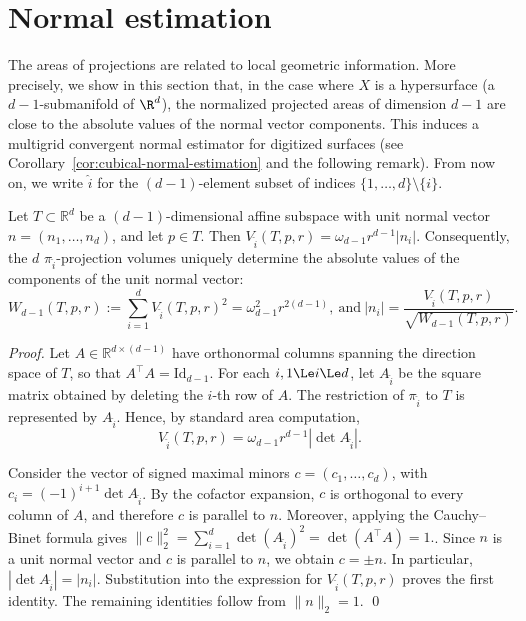 \section{Normal estimation}
\label{sec-normals}

The areas of projections are related to local geometric
information. More precisely, we show in this section that, in the case
where $X$ is a hypersurface (a $d-1$-submanifold of $\R^d$), the
normalized projected areas of dimension $d-1$ are close to the
absolute values of the normal vector components. This induces a
multigrid convergent normal estimator for digitized surfaces (see
Corollary~\ref{cor:cubical-normal-estimation} and the following
remark). From now on, we write $\widehat{i}$ for the $(d-1)$-element subset of
indices $\{1,\ldots,d\} \setminus \{ i \}$.

\begin{theorem}
\label{thm:normal-recovery}
Let $T\subset\mathbb R^d$ be a $(d-1)$-dimensional affine subspace
with unit normal vector $n=(n_1,\ldots,n_d)$, and let $p \in T$.
Then \( V_{\widehat{i}}(T,p,r)=\omega_{d-1}r^{d-1}|n_i|. \)
Consequently, the $d$ $\pi_{\widehat{i}}$-projection volumes uniquely
determine the absolute values of the components
of the unit normal vector:
\[
W_{d-1}(T,p,r) := \sum_{i=1}^d V_{\widehat{i}}(T,p,r)^2
=
\omega_{d-1}^2r^{2(d-1)},
~\text{and}~
|n_i|=\frac{V_{\widehat{i}}(T,p,r)}
{\sqrt{W_{d-1}(T,p,r)}}.
\]
\end{theorem}

\begin{proof}
Let $A\in\mathbb R^{d\times(d-1)}$ have orthonormal columns spanning
the direction space of $T$, so that $A^\top A=\mathrm{Id}_{d-1}$.  For each $i, 1\Le i \Le
d$, let $A_{\widehat i}$ be the square matrix obtained by deleting the
$i$-th row of $A$.  The restriction of $\pi_{\widehat i}$ to $T$ is
represented by $A_{\widehat i}$.  Hence, by standard area computation, 
\[
V_{\widehat{i}}(T,p,r)=\omega_{d-1}r^{d-1}|\det A_{\widehat i}|.
\]

\begin{sloppypar}
Consider the vector of signed maximal minors $c=(c_1,\ldots,c_d)$,
with $c_i = (-1)^{i+1} \det A_{\widehat i}$.  By the cofactor expansion,
$c$ is orthogonal to every column of $A$, and therefore $c$ is
parallel to $n$.
Moreover, applying the Cauchy--Binet formula gives
\(
\|c\|_2^2
=
\sum_{i=1}^d\det(A_{\widehat i})^2
=
\det(A^\top A)=1.
\).
Since $n$ is a unit normal vector and $c$ is parallel to $n$, we obtain
$c=\pm n$. In particular,
\(
|\det A_{\widehat i}|=|n_i|.
\)
Substitution into the expression for $V_{\widehat{i}}(T,p,r)$
proves the first identity. The remaining
identities follow from $\|n\|_2=1$. \qed
\end{sloppypar}
\end{proof}



